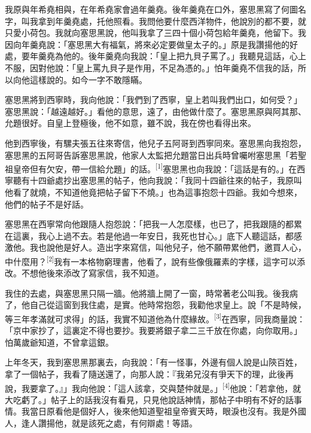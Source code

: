我原與年希堯相與，在年希堯家會過年羹堯。後年羹堯在口外，塞思黑寫了何圖名字，叫我拿到年羹堯處，托他照看。我問他要什麼西洋物件，他說別的都不要，就只愛小荷包。我就向塞思黑說，他叫我拿了三四十個小荷包給年羹堯，他留下。我因向年羹堯說：「塞思黑大有福氣，將來必定要做皇太子的。」原是我讚揚他的好處，要年羹堯為他的。後年羹堯向我說：「皇上把九貝子罵了。」我聽見這話，心上不服，因對他說：「皇上罵九貝子是作用，不足為憑的。」怕年羹堯不信我的話，所以向他這樣說的。如今一字不敢隱瞞。\par
塞思黑將到西寧時，我向他說：「我們到了西寧，皇上若叫我們出口，如何受？」塞思黑說：「越遠越好。」看他的意思，遠了，由他做什麼了。塞思黑原與阿其那、允題很好。自皇上登極後，他不如意，雖不說，我在傍也看得出來。\par
他到西寧後，有騾夫張五往來寄信，他兒子五阿哥到西寧同來。塞思黑向我抱怨，塞思黑的五阿哥告訴塞思黑說，他家人太監把允題當日出兵時曾囑咐塞思黑「若聖祖皇帝但有欠安，帶一信給允題」的話。\textsuperscript{[1]}塞思黑也向我說：「這話是有的。」在西寧聽有十四爺處抄出塞思黑的帖子，他向我說：「我同十四爺往來的帖子，我原叫他看了就燒，不知道他竟把帖子留下不燒。」也為這事抱怨十四爺。我如今想來，他們的帖子不是好話。\par
塞思黑在西寧常向他跟隨人抱怨說：「把我一人怎麼樣，也已了，把我跟隨的都累在這裏，我心上過不去。若是他過一年安日，我死也甘心。」底下人聽這話，都感激他。我也說他是好人。造出字來寫信，叫他兒子，他不願帶累他們，邀買人心，中什麼用？\textsuperscript{[2]}我有一本格物窮理書，他看了，說有些像俄羅素的字樣，這字可以添改。不想他後來添改了寫家信，我不知道。\par
我住的去處，與塞思黑只隔一牆。他將牆上開了一窗，時常著老公叫我。後我病了，他自己從這窗到我住處，是實。他時常抱怨，我勸他求皇上。說「不是時候，等三年孝滿就可求得」的話，我實不知道他為什麼緣故。\textsuperscript{[3]}在西寧，同我商量說：「京中家抄了，這裏定不得也要抄。我要將銀子拿二三千放在你處，向你取用。」怕萬歲爺知道，不曾拿這銀。\par
上年冬天，我到塞思黑那裏去，向我說：「有一怪事，外邊有個人說是山陝百姓，拿了一個帖子，我看了隨送還了，向那人說：『我弟兄沒有爭天下的理，此後再說，我要拿了。』」我向他說：「這人該拿，交與楚仲就是。」\textsuperscript{[4]}他說：「若拿他，就大吃虧了。」帖子上的話我沒有看見，只見他說話神情，那帖子中明有不好的話事情。我當日原看他是個好人，後來他知道聖祖皇帝賓天時，眼淚也沒有。我是外國人，逢人讚揚他，就是該死之處，有何辯處！等語。\par
